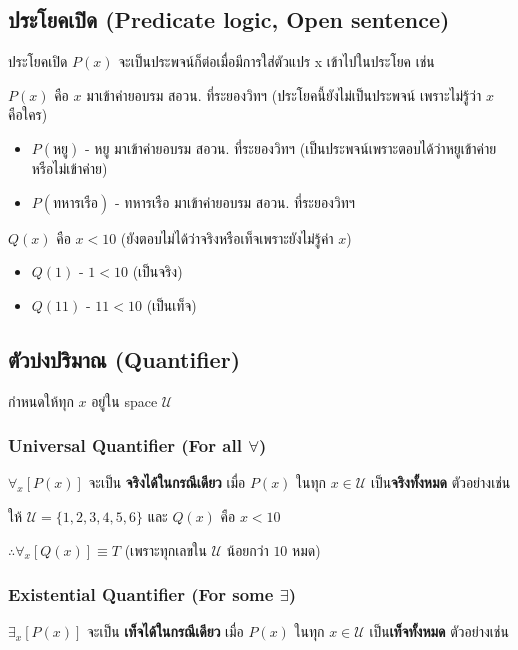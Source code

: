 \documentclass[12pt,a4paper]{article}
\begin{document}
\subsection*{ประโยคเปิด (Predicate logic, Open sentence)}
\quad ประโยคเปิด $P(x)$ จะเป็นประพจน์ก็ต่อเมื่อมีการใส่ตัวแปร x เข้าไปในประโยค เช่น \\
\rule{0pt}{4ex}
$P(x)$ คือ $x$ มาเข้าค่ายอบรม สอวน. ที่ระยองวิทฯ (ประโยคนี้ยังไม่เป็นประพจน์ เพราะไม่รู้ว่า $x$ คือใคร)
\begin{itemize}
    \item $P(\text{หยู})$ - หยู มาเข้าค่ายอบรม สอวน. ที่ระยองวิทฯ (เป็นประพจน์เพราะตอบได้ว่าหยูเข้าค่ายหรือไม่เข้าค่าย)
    \item $P(\text{ทหารเรือ})$ - ทหารเรือ มาเข้าค่ายอบรม สอวน. ที่ระยองวิทฯ
\end{itemize}
\rule{0pt}{4ex}
$Q(x)$ คือ $x < 10$ (ยังตอบไม่ได้ว่าจริงหรือเท็จเพราะยังไม่รู้ค่า $x$)
\begin{itemize}
    \item $Q(1)$ - $1 < 10$ (เป็นจริง)
    \item $Q(11)$ - $11 < 10$ (เป็นเท็จ)
\end{itemize}

\subsection*{ตัวบ่งปริมาณ (Quantifier)}
\quad กำหนดให้ทุก $x$ อยู่ใน space $\mathcal{U}$

\subsubsection*{Universal Quantifier (For all $\forall$)}
$\forall_x\left[ P(x) \right]$ จะเป็น \textbf{จริงได้ในกรณีเดียว} เมื่อ $P(x)$ ในทุก $x \in \mathcal{U}$ เป็น\textbf{จริงทั้งหมด} ตัวอย่างเช่น \\
\rule{0pt}{2.5ex}

ให้ $\mathcal{U} = \{1,2,3,4,5,6\}$ และ $Q(x)$ คือ $x < 10$\\
\rule{0pt}{4ex}
$\therefore \forall_x[Q(x)] \equiv T$ (เพราะทุกเลขใน $\mathcal{U}$ น้อยกว่า $10$ หมด)

\subsubsection*{Existential Quantifier (For some $\exists$)}
$\exists_x\left[ P(x) \right]$ จะเป็น \textbf{เท็จได้ในกรณีเดียว} เมื่อ $P(x)$ ในทุก $x \in \mathcal{U}$ เป็น\textbf{เท็จทั้งหมด} ตัวอย่างเช่น \\
\rule{0pt}{2.5ex}
\end{document}
